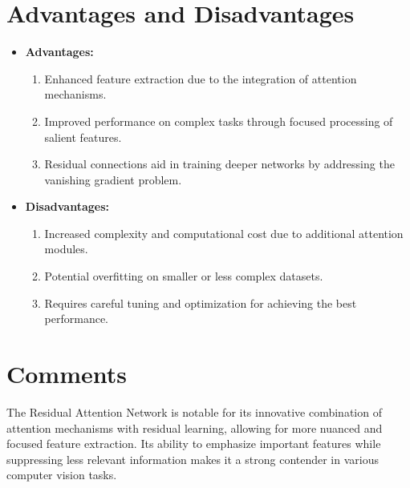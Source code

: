 \section{Advantages and Disadvantages}
\begin{itemize}
    \item \textbf{Advantages:}
    \begin{enumerate}
        \item Enhanced feature extraction due to the integration of attention mechanisms.
        \item Improved performance on complex tasks through focused processing of salient features.
        \item Residual connections aid in training deeper networks by addressing the vanishing gradient problem.
    \end{enumerate}
    \item \textbf{Disadvantages:}
    \begin{enumerate}
        \item Increased complexity and computational cost due to additional attention modules.
        \item Potential overfitting on smaller or less complex datasets.
        \item Requires careful tuning and optimization for achieving the best performance.
    \end{enumerate}
\end{itemize}

\section{Comments}
The Residual Attention Network is notable for its innovative combination of attention mechanisms with residual learning, allowing for more nuanced and focused feature extraction. Its ability to emphasize important features while suppressing less relevant information makes it a strong contender in various computer vision tasks.
